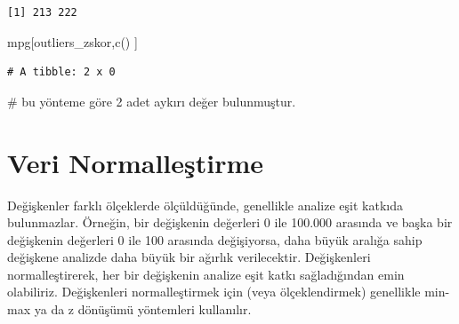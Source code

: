 \documentclass[
  letterpaper,
  DIV=11,
  numbers=noendperiod]{scrreprt}
\newenvironment{Shaded}{\begin{snugshade}}{\end{snugshade}}
\newcommand{\CommentTok}[1]{\textcolor[rgb]{0.37,0.37,0.37}{#1}}
\newcommand{\FunctionTok}[1]{\textcolor[rgb]{0.28,0.35,0.67}{#1}}
\newcommand{\NormalTok}[1]{\textcolor[rgb]{0.00,0.23,0.31}{#1}}
\begin{document}
\begin{verbatim}
[1] 213 222
\end{verbatim}

\begin{Shaded}
\begin{Highlighting}[]
\NormalTok{mpg[outliers\_zskor,}\FunctionTok{c}\NormalTok{() ]}
\end{Highlighting}
\end{Shaded}

\begin{verbatim}
# A tibble: 2 x 0
\end{verbatim}

\begin{Shaded}
\begin{Highlighting}[]
\CommentTok{\# bu yönteme göre 2 adet aykırı değer bulunmuştur.}
\end{Highlighting}
\end{Shaded}

\section*{Veri Normalleştirme}\label{veri-normalleux15ftirme}


Değişkenler farklı ölçeklerde ölçüldüğünde, genellikle analize eşit
katkıda bulunmazlar. Örneğin, bir değişkenin değerleri 0 ile 100.000
arasında ve başka bir değişkenin değerleri 0 ile 100 arasında
değişiyorsa, daha büyük aralığa sahip değişkene analizde daha büyük bir
ağırlık verilecektir. Değişkenleri normalleştirerek, her bir değişkenin
analize eşit katkı sağladığından emin olabiliriz. Değişkenleri
normalleştirmek için (veya ölçeklendirmek) genellikle min-max ya da z
dönüşümü yöntemleri kullanılır.
\end{document}
